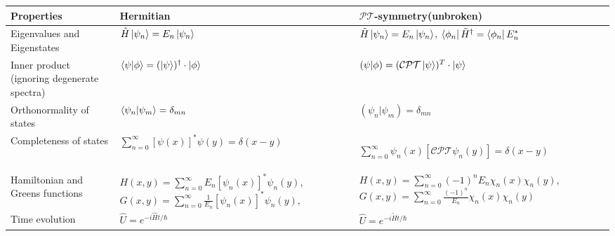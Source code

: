 \documentclass[12pt, a4paper]{report}
\newcommand\PT{\(\mathcal{PT}\)}
\begin{document}
{\renewcommand{\arraystretch}{2}
\noindent\begin{tabularx}{1.1\textwidth} { 
  | >{\raggedright\arraybackslash}X 
  | >{\raggedright\arraybackslash}X 
  | >{\raggedright\arraybackslash}X | }
 \hline
  \textbf{Properties} 
  & \textbf{Hermitian} 
  & \textbf{\PT-symmetry}\newline \small{(unbroken)} \\
   \hline
  Eigenvalues \newline and Eigenstates
  & $\hat{H}\ket{\psi_n} = E_n \ket{\psi_n}$ 
  & $\tilde{H}\ket{\psi_n} = E_n \ket{\psi_n}$, $\bra{\phi_n}\tilde{H}^{\dagger} = \bra{\phi_n}E_{n}^{*}$\\
  \hline
  Inner product \newline \tiny{(ignoring degenerate spectra)}
  & $\braket{\psi|\phi} = (\ket{\psi})^{\dagger} \cdot \ket{\phi}$
  & $\left(\psi|\phi\right) = (\mathcal{CPT}\ket{\psi})^{T} \cdot \ket{\psi}$ \\
  \hline
  Orthonormality of states 
  & $\braket{\psi_n|\psi_m} = \delta_{mn}$ 
  & $\left(\psi_n|\psi_m\right) = \delta_{mn}$\\
  \hline
  Completeness of states 
  & $\sum\limits_{n = 0}^{\infty} [\psi(x)]^{*} \psi(y) = \delta(x-y)$
  & \begin{small}{$\sum\limits_{n = 0}^{\infty} \psi_n(x) [\mathcal{CPT}\psi_n(y)] = \delta(x-y)$}\end{small}\\
  \hline
  Hamiltonian and Greens functions 
  & \small{$H(x,y) = \sum\limits_{n = 0}^{\infty} E_n [\psi_n(x)]^{*}\psi_n(y)$,
  \newline $G(x,y) = \sum\limits_{n = 0}^{\infty} \frac{1}{E_n} [\psi_n(x)]^{*}\psi_n(y)$,}
  & \small{$H(x,y) = \sum\limits_{n = 0}^{\infty}(-1)^{n} E_n \chi_n(x)\chi_n(y)$,
  \newline $G(x,y) = \sum\limits_{n = 0}^{\infty} \frac{(-1)^n}{E_n}\chi_n(x)\chi_n(y)$}\\

  \hline
  Time evolution
  & $\hat{U} = e^{-i\hat{H}t/\hbar}$
  & $\hat{U} = e^{-i\tilde{H}t/\hbar}$\\
  \hline
\end{tabularx}
}
\end{document}
